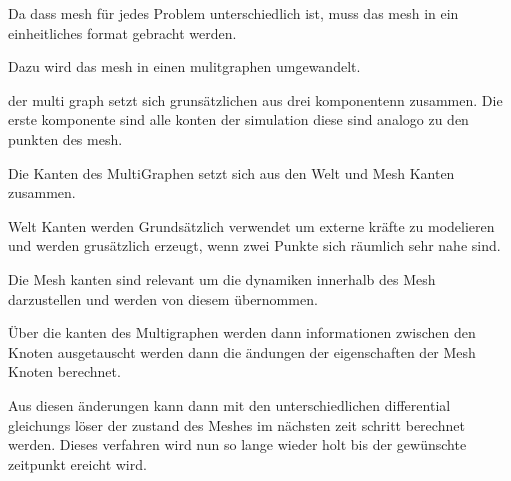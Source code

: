 Da dass mesh für jedes Problem unterschiedlich ist, muss das mesh in ein einheitliches format gebracht werden.

Dazu wird das mesh in einen mulitgraphen umgewandelt.

der multi graph setzt sich grunsätzlichen aus drei komponentenn zusammen.
Die erste komponente sind alle konten der simulation diese sind analogo zu den punkten des mesh.

Die Kanten des MultiGraphen setzt sich aus den Welt und Mesh Kanten zusammen.

Welt Kanten werden Grundsätzlich verwendet um externe kräfte zu modelieren und werden grusätzlich erzeugt, wenn zwei 
Punkte sich räumlich sehr nahe sind.

Die Mesh kanten sind relevant um die dynamiken innerhalb des Mesh darzustellen und werden von diesem übernommen.

Über die kanten des Multigraphen werden dann informationen zwischen den Knoten ausgetauscht werden dann die 
ändungen der eigenschaften der Mesh Knoten berechnet.

Aus diesen änderungen kann dann mit den unterschiedlichen differential gleichungs löser der zustand des Meshes im nächsten zeit schritt berechnet werden. Dieses verfahren wird nun so lange wieder holt bis der gewünschte zeitpunkt ereicht wird.









